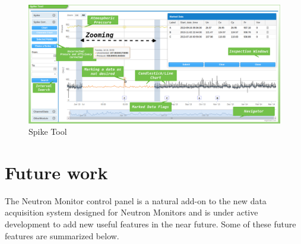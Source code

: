 \documentclass[a4paper]{jpconf}
\begin{document}
\begin{figure}[h]
    \centering
    \includegraphics[keepaspectratio, width=1\textwidth]{./resources/SpikeTool.png}
    \caption{Spike Tool}
    \label{fig:SpikeTool}
\end{figure}

\section{Future work}

The Neutron Monitor control panel is a natural add-on to the new data
acquisition system designed for Neutron Monitors and is under active
development to add new useful features in the near future. Some of these future
features are summarized below.
\end{document}

